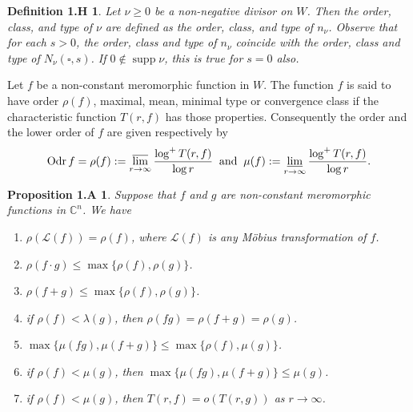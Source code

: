 \documentclass[11pt,reqno]{amsart}
\newtheorem*{propo1A}{Proposition 1.A}
\newtheorem*{defi1H}{Definition 1.H}
\numberwithin{equation}{section}
\begin{document}
\begin{defi1H}\cite[pp. 28]{Stoll-1974}Let $\nu\geq 0$ be a non-negative divisor on $W$. Then the order, class, and type
of $\nu$ are defined as the order, class, and type of $n_{\nu}$. Observe that for each $s>0$, the order, class and type of $n_{\nu}$
coincide with the order, class and type of $N_{\nu}(\square,s)$. If $0\notin \operatorname{supp}\nu$, this is true for $s=0$ also.
\end{defi1H}

Let $f$ be a non-constant meromorphic function in $W$. The function $f$ is said to have order $\rho(f)$, maximal, mean, minimal type or convergence class if the characteristic function $T(r,f)$ has those properties. Consequently the order and the lower order of $f$ are given respectively by
\[\operatorname{Odr} f= \rho(f):=\varlimsup\limits_{r\to \infty}\frac{\log^+ T(r,f)}{\log r}\;\;\text{and}\;\;\mu(f):=\varliminf\limits_{r\to \infty}\frac{\log^+ T(r,f)}{\log r}.\]

\begin{propo1A}\cite[Proposition 1.7]{Hu-Li-Yang-2003}
Suppose that $f$ and $g$ are non-constant meromorphic functions in $\mathbb{C}^n$. We have
\begin{enumerate}
    \item[(a)] $\rho(\mathcal{L}(f)) = \rho(f)$, where $\mathcal{L}(f)$ is any M\"{o}bius transformation of $f$.
    \item[(b)] $\rho (f \cdot g) \leq \max\{\rho(f), \rho(g)\}$.
    \item[(c)] $\rho(f + g) \leq \max\{\rho(f), \rho(g)\}$.
    \item[(d)] if $\rho(f) < \lambda(g)$, then $\rho(fg) = \rho(f + g) = \rho(g)$.
    \item[(e)] $\max\{\mu(fg), \mu(f + g)\} \leq \max\{\rho(f), \mu(g)\}$.
    \item[(f)] if $\rho(f) < \mu(g)$, then $\max\{\mu(fg), \mu(f + g)\} \leq \mu(g)$.
    \item[(g)] if $\rho(f) < \mu(g)$, then $T(r, f) = o(T(r, g))$ as $r \to \infty$.
\end{enumerate}
\end{propo1A}
\end{document}
